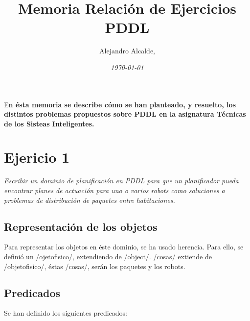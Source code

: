 \documentclass[	DIV=calc,%
							paper=a4,%
							fontsize=11pt]{scrartcl}	 					%
\title{Memoria Relación de Ejercicios PDDL}					%
\author{Alejandro Alcalde, }											%
\date{\textit{\today}}																				%
\newcommand{\initial}[1]{%
     \lettrine[lines=3,lhang=0.3,nindent=0em]{
     				\color{DarkGoldenrod}
     				{\textsf{#1}}}{}}
\begin{document}
\maketitle
\thispagestyle{fancy} 			%
\initial{E}\textbf{n ésta memoria se describe cómo se han planteado, y resuelto, los distintos problemas propuestos sobre PDDL en la asignatura Técnicas de los Sisteas Inteligentes.}

\section{Ejericio 1}

\textit{Escribir un dominio de planificación en PDDL para que un planificador pueda encontrar planes de actuación para uno o varios robots como
soluciones a problemas de distribución de paquetes entre habitaciones.}

\subsection{Representación de los objetos}

Para representar los objetos en éste dominio, se ha usado herencia. Para ello, se definió un \newlispinline/ojetofisico/, extendiendo de \newlispinline/object/. \newlispinline/cosas/ extiende de \newlispinline/objetofisico/, éstas \newlispinline/cosas/, serán los paquetes y los robots.

\subsection{Predicados}

Se han definido los siguientes predicados:
\end{document}

